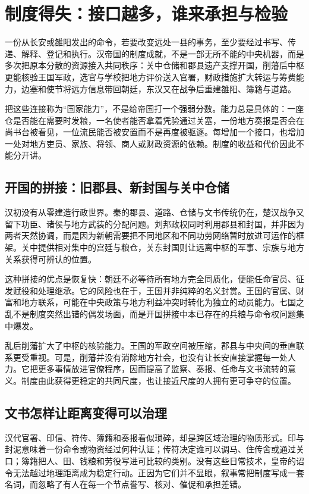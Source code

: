 \section{制度得失：接口越多，谁来承担与检验}
\label{sec:synthesis-institutional-gains}

一份从长安或雒阳发出的命令，若要改变远处一县的事务，至少要经过书写、传递、解释、登记和执行。汉帝国的制度成就，不是一部无所不能的中央机器，而是多次把原本分散的资源接入共同秩序：关中仓储和郡县遗产支撑开国，削藩后中枢更能核验王国军政，选官与学校把地方评价送入官署，财政措施扩大转运与筹费能力，边塞和使节将远方信息带回朝廷，东汉又在战争后重建雒阳、簿籍与道路。

把这些连接称为“国家能力”，不是给帝国打一个强弱分数。能力总是具体的：一座仓是否能在需要时发粮，一名使者能否拿着凭验通过关塞，一份地方奏报是否会在尚书台被看见，一位流民能否被安置而不是再度被驱逐。每增加一个接口，也增加一处对地方吏员、家族、将领、商人或财政资源的依赖。制度的收益和代价因此不能分开讲。

\subsection{开国的拼接：旧郡县、新封国与关中仓储}

汉初没有从零建造行政世界。秦的郡县、道路、仓储与文书传统仍在，楚汉战争又留下功臣、诸侯与地方武装的分配问题。刘邦政权同时利用郡县和封国，并非因为两者天然协调，而是因为新朝需要把不同地区和不同功劳网络暂时放进可运作的框架。关中提供相对集中的宫廷与粮仓，关东封国则让远离中枢的军事、宗族与地方关系获得可辨认的位置。

这种拼接的优点是恢复快：朝廷不必等待所有地方完全同质化，便能任命官员、征发赋役和处理继承。它的风险也在于，王国并非纯粹的名义封赏。王国的官属、财富和地方联系，可能在中央政策与地方利益冲突时转化为独立的动员能力。七国之乱不是制度突然出错的偶发场面，而是开国拼接中本已存在的兵粮与命令权问题集中爆发。

乱后削藩扩大了中枢的核验能力。王国的军政空间被压缩，郡县与中央间的垂直联系更受重视。可是，削藩并没有消除地方社会，也没有让长安直接掌握每一处人力。它把更多事情放进官僚程序，因而提高了监察、奏报、任命与文书流转的意义。制度由此获得更稳定的共同尺度，也让接近尺度的人拥有更可争夺的位置。

\subsection{文书怎样让距离变得可以治理}

汉代官署、印信、符传、簿籍和奏报看似琐碎，却是跨区域治理的物质形式。印与封泥意味着一份命令或物资经过何种认证；传符决定谁可以调马、住传舍或通过关口；簿籍把人、田、钱粮和劳役写进可比较的类别。没有这些日常技术，皇帝的诏令无法越过地理距离成为稳定行动。正因为它们并不显眼，叙事常把制度写成一套名词，而忽略了有人在每一个节点誊写、核对、催促和承担差错。

